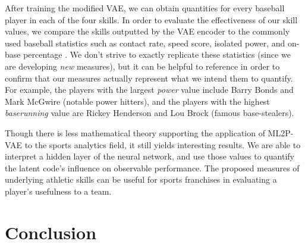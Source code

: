 After training the modified VAE, we can obtain quantities for every baseball player in each of the four skills. In order to evaluate the effectiveness of our skill values, we compare the skills outputted by the VAE encoder to the commonly used baseball statistics such as contact rate, speed score, isolated power, and on-base percentage \cite{baseball_reference}. We don't strive to exactly replicate these statistics (since we are developing \textit{new} measures), but it can be helpful to reference in order to confirm that our measures actually represent what we intend them to quantify. For example, the players with the largest \textit{power} value include Barry Bonds and Mark McGwire (notable power hitters), and the players with the highest \textit{baserunning} value are Rickey Henderson and Lou Brock (famous base-stealers).

Though there is less mathematical theory supporting the application of ML2P-VAE to the sports analytics field, it still yields interesting results. We are able to interpret a hidden layer of the neural network, and use those values to quantify the latent code's influence on observable performance. The proposed measures of underlying athletic skills can be useful for sports franchises in evaluating a player's usefulness to a team.

\section{Conclusion}

